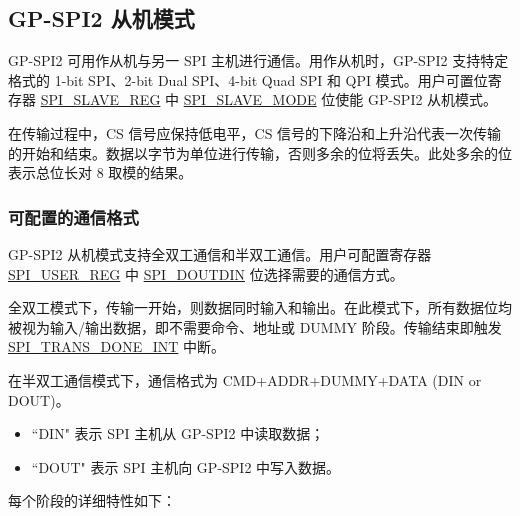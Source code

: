 \documentclass[main\_\_CN.tex]{subfiles}
\begin{document}
\subsection{GP-SPI2 从机模式}\label{sec:spi-func-descr-gp-spi2-slave}

GP-SPI2 可用作从机与另一 SPI 主机进行通信。用作从机时，GP-SPI2 支持特定格式的 1-bit SPI、2-bit Dual SPI、4-bit Quad SPI 和 QPI 模式。用户可置位寄存器 \hyperref[regdesc:SPISLAVEREG]{SPI\_SLAVE\_REG} 中 \hyperref[fielddesc:SPISLAVEMODE]{SPI\_SLAVE\_MODE} 位使能 GP-SPI2 从机模式。

在传输过程中，CS 信号应保持低电平，CS 信号的下降沿和上升沿代表一次传输的开始和结束。数据以字节为单位进行传输，否则多余的位将丢失。此处多余的位表示总位长对 8 取模的结果。

\subsubsection{可配置的通信格式}\label{sec:spi-slave-communication-format}

GP-SPI2 从机模式支持全双工通信和半双工通信。用户可配置寄存器 \hyperref[regdesc:SPIUSERREG]{SPI\_USER\_REG} 中 \hyperref[fielddesc:SPIDOUTDIN]{SPI\_DOUTDIN} 位选择需要的通信方式。

全双工模式下，传输一开始，则数据同时输入和输出。在此模式下，所有数据位均被视为输入/输出数据，即不需要命令、地址或 DUMMY 阶段。传输结束即触发 \hyperref[int:SPITRANSDONEINT]{SPI\_TRANS\_DONE\_INT} 中断。

在半双工通信模式下，通信格式为 CMD+ADDR+DUMMY+DATA (DIN or DOUT)。
\begin{itemize}
    \item ``DIN" 表示 SPI 主机从 GP-SPI2 中读取数据；
    \item ``DOUT" 表示 SPI 主机向 GP-SPI2 中写入数据。
\end{itemize}

每个阶段的详细特性如下：
\end{document}
